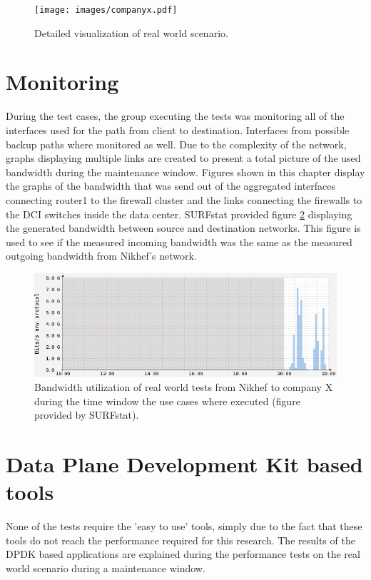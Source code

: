 \begin{figure}[H] 
  \texttt{[image: images/companyx.pdf]}
  \caption{Detailed visualization of real world scenario.}
  \label{fig:companyx}
\end{figure}

\section{Monitoring}\label{sec:monitoring}
During the test cases, the group executing the tests was monitoring all of the interfaces used for the path from client to destination.
Interfaces from possible backup paths where monitored as well. 
Due to the complexity of the network, graphs displaying multiple links are created to present a total picture of the used bandwidth during the maintenance window.
Figures shown in this chapter display the graphs of the bandwidth that was send out of the aggregated interfaces connecting router1 to the firewall cluster and the links connecting the firewalls to the DCI switches inside the data center. 
SURFstat provided figure \ref{fig:surftest} displaying the generated bandwidth between source and destination networks.
This figure is used to see if the measured incoming bandwidth was the same as the measured outgoing bandwidth from Nikhef's network.

\begin{figure}[H]
  \includegraphics[scale=0.8]{images/test-link-usage.png}
  \caption{Bandwidth utilization of real world tests from Nikhef to company X during the time window the use cases where executed (figure provided by SURFstat).}
  \label{fig:surftest}
\end{figure}

\section{Data Plane Development Kit based tools}
None of the tests require the 'easy to use' tools, simply due to the fact that these tools do not reach the performance required for this research. 
The results of the DPDK based applications are explained during the performance tests on the real world scenario during a maintenance window.
 
